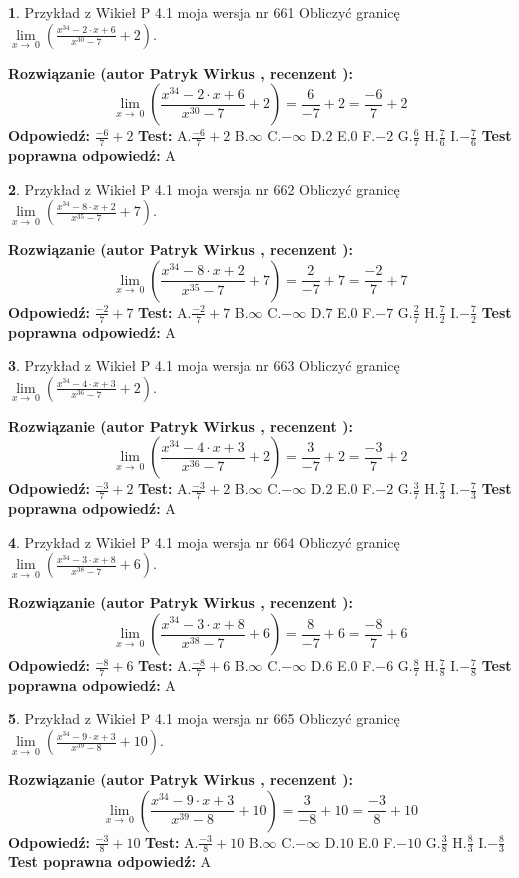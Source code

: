 \documentclass[12pt, a4paper]{article}
\theoremstyle{definition} %
\newtheorem{zad}{}
\newcommand{\zadStart}[1]{\begin{zad}#1\newline}
\newcommand{\zadStop}{\end{zad}}
\newcommand{\rozwStart}[2]{\noindent \textbf{Rozwiązanie (autor #1 , recenzent #2): }\newline}
\newcommand{\rozwStop}{\newline}
\newcommand{\odpStart}{\noindent \textbf{Odpowiedź:}\newline}
\newcommand{\odpStop}{\newline}
\newcommand{\testStart}{\noindent \textbf{Test:}\newline}
\newcommand{\testStop}{\newline}
\newcommand{\kluczStart}{\noindent \textbf{Test poprawna odpowiedź:}\newline}
\newcommand{\kluczStop}{\newline}
\begin{document}
\zadStart{Przykład z Wikieł P 4.1 moja wersja nr 661}
Obliczyć granicę $\lim\limits_{x\to\ 0}(\frac{x^{34}-2 \cdot x +6}{x^{30}-7}+2)$.
\zadStop
\rozwStart{Patryk Wirkus}{}
$$\lim\limits_{x\to\ 0}(\frac{x^{34}-2 \cdot x +6}{x^{30}-7}+2)=\frac{6}{-7}+2=\frac{-6}{7}+2$$
\rozwStop
\odpStart
$\frac{-6}{7}+2$
\odpStop
\testStart
A.$\frac{-6}{7}+2$
B.$\infty$
C.$-\infty$
D.$2$
E.$0$
F.$-2$
G.$\frac{6}{7}$
H.$\frac{7}{6}$
I.$-\frac{7}{6}$
\testStop
\kluczStart
A
\kluczStop



\zadStart{Przykład z Wikieł P 4.1 moja wersja nr 662}
Obliczyć granicę $\lim\limits_{x\to\ 0}(\frac{x^{34}-8 \cdot x +2}{x^{35}-7}+7)$.
\zadStop
\rozwStart{Patryk Wirkus}{}
$$\lim\limits_{x\to\ 0}(\frac{x^{34}-8 \cdot x +2}{x^{35}-7}+7)=\frac{2}{-7}+7=\frac{-2}{7}+7$$
\rozwStop
\odpStart
$\frac{-2}{7}+7$
\odpStop
\testStart
A.$\frac{-2}{7}+7$
B.$\infty$
C.$-\infty$
D.$7$
E.$0$
F.$-7$
G.$\frac{2}{7}$
H.$\frac{7}{2}$
I.$-\frac{7}{2}$
\testStop
\kluczStart
A
\kluczStop



\zadStart{Przykład z Wikieł P 4.1 moja wersja nr 663}
Obliczyć granicę $\lim\limits_{x\to\ 0}(\frac{x^{34}-4 \cdot x +3}{x^{36}-7}+2)$.
\zadStop
\rozwStart{Patryk Wirkus}{}
$$\lim\limits_{x\to\ 0}(\frac{x^{34}-4 \cdot x +3}{x^{36}-7}+2)=\frac{3}{-7}+2=\frac{-3}{7}+2$$
\rozwStop
\odpStart
$\frac{-3}{7}+2$
\odpStop
\testStart
A.$\frac{-3}{7}+2$
B.$\infty$
C.$-\infty$
D.$2$
E.$0$
F.$-2$
G.$\frac{3}{7}$
H.$\frac{7}{3}$
I.$-\frac{7}{3}$
\testStop
\kluczStart
A
\kluczStop



\zadStart{Przykład z Wikieł P 4.1 moja wersja nr 664}
Obliczyć granicę $\lim\limits_{x\to\ 0}(\frac{x^{34}-3 \cdot x +8}{x^{38}-7}+6)$.
\zadStop
\rozwStart{Patryk Wirkus}{}
$$\lim\limits_{x\to\ 0}(\frac{x^{34}-3 \cdot x +8}{x^{38}-7}+6)=\frac{8}{-7}+6=\frac{-8}{7}+6$$
\rozwStop
\odpStart
$\frac{-8}{7}+6$
\odpStop
\testStart
A.$\frac{-8}{7}+6$
B.$\infty$
C.$-\infty$
D.$6$
E.$0$
F.$-6$
G.$\frac{8}{7}$
H.$\frac{7}{8}$
I.$-\frac{7}{8}$
\testStop
\kluczStart
A
\kluczStop



\zadStart{Przykład z Wikieł P 4.1 moja wersja nr 665}
Obliczyć granicę $\lim\limits_{x\to\ 0}(\frac{x^{34}-9 \cdot x +3}{x^{39}-8}+10)$.
\zadStop
\rozwStart{Patryk Wirkus}{}
$$\lim\limits_{x\to\ 0}(\frac{x^{34}-9 \cdot x +3}{x^{39}-8}+10)=\frac{3}{-8}+10=\frac{-3}{8}+10$$
\rozwStop
\odpStart
$\frac{-3}{8}+10$
\odpStop
\testStart
A.$\frac{-3}{8}+10$
B.$\infty$
C.$-\infty$
D.$10$
E.$0$
F.$-10$
G.$\frac{3}{8}$
H.$\frac{8}{3}$
I.$-\frac{8}{3}$
\testStop
\kluczStart
A
\kluczStop
\end{document}
